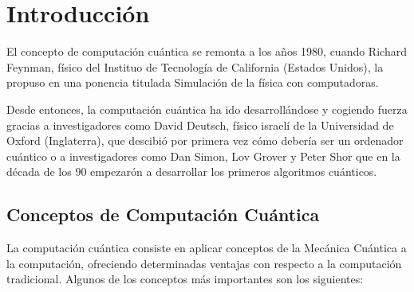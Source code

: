 \chapter{Introducción}

El concepto de computación cuántica se remonta a los años 1980, cuando Richard Feynman, físico del Instituo de Tecnología de California (Estados Unidos), la propuso en una ponencia titulada Simulación de la física con computadoras.

Desde entonces, la computación cuántica ha ido desarrollándose y cogiendo fuerza gracias a investigadores como David Deutsch, físico israelí de la Universidad de Oxford (Inglaterra), que descibió por primera vez cómo debería ser un ordenador cuántico o a investigadores como Dan Simon, Lov Grover y Peter Shor que en la década de los 90 empezarón a desarrollar los primeros algoritmos cuánticos.

\section{Conceptos de Computación Cuántica}
La computación cuántica consiste en aplicar conceptos de la Mecánica Cuántica a la computación, ofreciendo determinadas ventajas con respecto a la computación tradicional.
Algunos de los conceptos más importantes son los siguientes:

